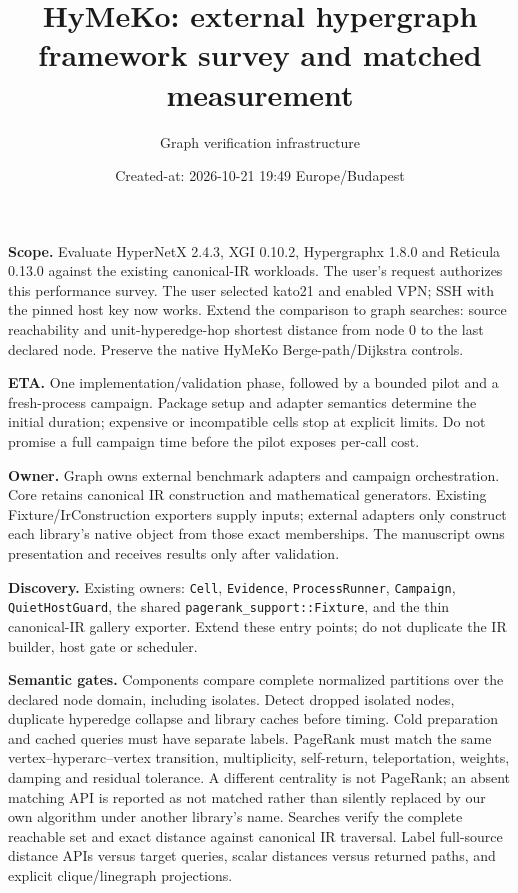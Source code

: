 \documentclass[10pt,a4paper]{article}
\title{HyMeKo: external hypergraph framework survey and matched measurement}
\author{Graph verification infrastructure}\date{Created-at: 2026-10-21 19:49 Europe/Budapest}
\begin{document}
\maketitle
\textbf{Scope.} Evaluate HyperNetX 2.4.3, XGI 0.10.2, Hypergraphx 1.8.0 and
Reticula 0.13.0 against the existing canonical-IR workloads. The user's request
authorizes this performance survey. The user selected kato21 and enabled VPN;
SSH with the pinned host key now works. Extend the comparison to graph searches:
source reachability and unit-hyperedge-hop shortest distance from node 0 to the
last declared node. Preserve the native HyMeKo Berge-path/Dijkstra controls.

\textbf{ETA.} One implementation/validation phase, followed by a bounded pilot
and a fresh-process campaign. Package setup and adapter semantics determine the
initial duration; expensive or incompatible cells stop at explicit limits.
Do not promise a full campaign time before the pilot exposes per-call cost.

\textbf{Owner.} Graph owns external benchmark adapters and campaign orchestration.
Core retains canonical IR construction and mathematical generators. Existing
Fixture/IrConstruction exporters supply inputs; external adapters only construct
each library's native object from those exact memberships. The manuscript owns
presentation and receives results only after validation.

\textbf{Discovery.} Existing owners: \texttt{Cell}, \texttt{Evidence},
\texttt{ProcessRunner}, \texttt{Campaign}, \texttt{QuietHostGuard}, the shared
\texttt{pagerank\_support::Fixture}, and the thin canonical-IR gallery exporter.
Extend these entry points; do not duplicate the IR builder, host gate or scheduler.



\textbf{Semantic gates.} Components compare complete normalized partitions over
the declared node domain, including isolates. Detect dropped isolated nodes,
duplicate hyperedge collapse and library caches before timing. Cold preparation
and cached queries must have separate labels. PageRank must match the same
vertex--hyperarc--vertex transition, multiplicity, self-return, teleportation,
weights, damping and residual tolerance. A different centrality is not PageRank;
an absent matching API is reported as not matched rather than silently replaced
by our own algorithm under another library's name.
Searches verify the complete reachable set and exact distance against canonical
IR traversal. Label full-source distance APIs versus target queries, scalar
distances versus returned paths, and explicit clique/linegraph projections.
\end{document}
